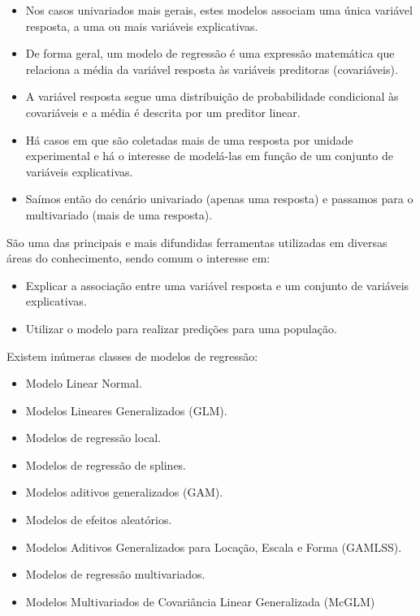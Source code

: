 \documentclass[10pt,
  aspectratio=169,
  serif,
  mathserif,
  professionalfont,
  compress,
  handout,
  ]{beamer}\usepackage[]{graphicx}\usepackage[]{color}
\begin{document}
\begin{frame}[c, allowframebreaks]

\begin{itemize}
  
  \item Nos casos univariados mais gerais, estes modelos associam uma única variável resposta, a uma ou mais variáveis explicativas.

  \item De forma geral, um modelo de regressão é uma expressão matemática que relaciona a média da variável resposta às variáveis preditoras (covariáveis).
  
  \item A variável resposta segue uma distribuição de probabilidade condicional às covariáveis e a média é descrita por um preditor linear.

  \item Há casos em que são coletadas mais de uma resposta por unidade experimental e há o interesse de modelá-las em função de um conjunto de variáveis explicativas.
  
  \item Saímos então do cenário univariado (apenas uma resposta) e passamos para o multivariado (mais de uma resposta).
  
\end{itemize}

\framebreak 

São uma das principais e mais difundidas ferramentas utilizadas em diversas áreas do conhecimento, sendo comum o interesse em:

\begin{itemize}
  \item Explicar a associação entre uma variável resposta e um conjunto de variáveis explicativas.
  
  \item Utilizar o modelo para realizar predições para uma população.
\end{itemize}

\framebreak

Existem inúmeras classes de modelos de regressão:

\begin{itemize}
 \item Modelo Linear Normal.
 \item Modelos Lineares Generalizados (GLM).
 \item Modelos de regressão local.
 \item Modelos de regressão de splines.
 \item Modelos aditivos generalizados (GAM).
 \item Modelos de efeitos aleatórios.
 \item Modelos Aditivos Generalizados para Locação, Escala e Forma (GAMLSS).
 \item Modelos de regressão multivariados.
 \item Modelos Multivariados de Covariância Linear Generalizada (McGLM)
\end{itemize}


\end{frame}
\end{document}
